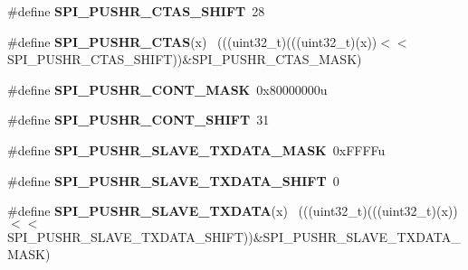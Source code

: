 \begin{DoxyCompactItemize}
\item 
\hypertarget{group___s_p_i___register___masks_ga16a0810e65793ba9f24a5ae8be8cf49a}{}\#define {\bfseries S\+P\+I\+\_\+\+P\+U\+S\+H\+R\+\_\+\+C\+T\+A\+S\+\_\+\+S\+H\+I\+F\+T}~28\label{group___s_p_i___register___masks_ga16a0810e65793ba9f24a5ae8be8cf49a}

\item 
\hypertarget{group___s_p_i___register___masks_gac2446ecf47a72694699c44e9c0f92997}{}\#define {\bfseries S\+P\+I\+\_\+\+P\+U\+S\+H\+R\+\_\+\+C\+T\+A\+S}(x)                                            ~(((uint32\+\_\+t)(((uint32\+\_\+t)(x))$<$$<$S\+P\+I\+\_\+\+P\+U\+S\+H\+R\+\_\+\+C\+T\+A\+S\+\_\+\+S\+H\+I\+F\+T))\&S\+P\+I\+\_\+\+P\+U\+S\+H\+R\+\_\+\+C\+T\+A\+S\+\_\+\+M\+A\+S\+K)\label{group___s_p_i___register___masks_gac2446ecf47a72694699c44e9c0f92997}

\item 
\hypertarget{group___s_p_i___register___masks_gac28b0accd475a1a991ccece8d1333ae0}{}\#define {\bfseries S\+P\+I\+\_\+\+P\+U\+S\+H\+R\+\_\+\+C\+O\+N\+T\+\_\+\+M\+A\+S\+K}~0x80000000u\label{group___s_p_i___register___masks_gac28b0accd475a1a991ccece8d1333ae0}

\item 
\hypertarget{group___s_p_i___register___masks_gab114a13d8478311e8b77778d4cbd5d96}{}\#define {\bfseries S\+P\+I\+\_\+\+P\+U\+S\+H\+R\+\_\+\+C\+O\+N\+T\+\_\+\+S\+H\+I\+F\+T}~31\label{group___s_p_i___register___masks_gab114a13d8478311e8b77778d4cbd5d96}

\item 
\hypertarget{group___s_p_i___register___masks_ga70296421b5faddc6c9fbbb984685b5a0}{}\#define {\bfseries S\+P\+I\+\_\+\+P\+U\+S\+H\+R\+\_\+\+S\+L\+A\+V\+E\+\_\+\+T\+X\+D\+A\+T\+A\+\_\+\+M\+A\+S\+K}~0x\+F\+F\+F\+Fu\label{group___s_p_i___register___masks_ga70296421b5faddc6c9fbbb984685b5a0}

\item 
\hypertarget{group___s_p_i___register___masks_gaa965b8c34dc45034184a2cad39a0b825}{}\#define {\bfseries S\+P\+I\+\_\+\+P\+U\+S\+H\+R\+\_\+\+S\+L\+A\+V\+E\+\_\+\+T\+X\+D\+A\+T\+A\+\_\+\+S\+H\+I\+F\+T}~0\label{group___s_p_i___register___masks_gaa965b8c34dc45034184a2cad39a0b825}

\item 
\hypertarget{group___s_p_i___register___masks_ga7224e49e3e609c3402d9b069f906fc5a}{}\#define {\bfseries S\+P\+I\+\_\+\+P\+U\+S\+H\+R\+\_\+\+S\+L\+A\+V\+E\+\_\+\+T\+X\+D\+A\+T\+A}(x)                            ~(((uint32\+\_\+t)(((uint32\+\_\+t)(x))$<$$<$S\+P\+I\+\_\+\+P\+U\+S\+H\+R\+\_\+\+S\+L\+A\+V\+E\+\_\+\+T\+X\+D\+A\+T\+A\+\_\+\+S\+H\+I\+F\+T))\&S\+P\+I\+\_\+\+P\+U\+S\+H\+R\+\_\+\+S\+L\+A\+V\+E\+\_\+\+T\+X\+D\+A\+T\+A\+\_\+\+M\+A\+S\+K)\label{group___s_p_i___register___masks_ga7224e49e3e609c3402d9b069f906fc5a}


\end{DoxyCompactItemize}
